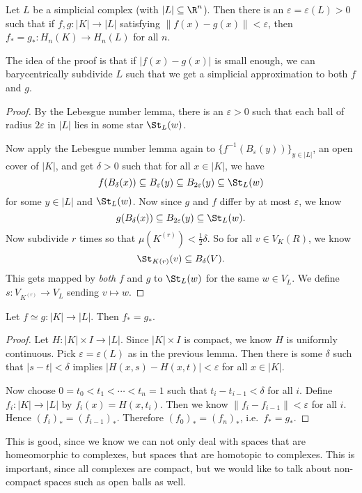\documentclass[a4paper]{article}
\begin{document}
\begin{lemma}
  Let $L$ be a simplicial complex (with $|L| \subseteq \R^n$). Then there is an $\varepsilon = \varepsilon(L) > 0$ such that if $f, g: |K| \to |L|$ satisfying $\|f(x) - g(x)\| < \varepsilon$, then $f_* = g_*: H_n(K) \to H_n(L)$ for all $n$.
\end{lemma}
The idea of the proof is that if $|f(x) - g(x)|$ is small enough, we can barycentrically subdivide $L$ such that we get a simplicial approximation to both $f$ and $g$.
\begin{proof}
  By the Lebesgue number lemma, there is an $\varepsilon > 0$ such that each ball of radius $2\varepsilon$ in $|L|$ lies in some star $\St_L(w)$.

  Now apply the Lebesgue number lemma again to $\{f^{-1}(B_\varepsilon(y))\}_{y \in |L|}$, an open cover of $|K|$, and get $\delta > 0$ such that for all $x \in |K|$, we have
  \[
    f(B_\delta(x)) \subseteq B_\varepsilon(y) \subseteq B_{2\varepsilon}(y) \subseteq \St_L(w)
  \]
  for some $y \in |L|$ and $\St_L(w)$. Now since $g$ and $f$ differ by at most $\varepsilon$, we know
  \[
    g(B_\delta(x)) \subseteq B_{2\varepsilon}(y) \subseteq \St_L(w).
  \]
  Now subdivide $r$ times so that $\mu(K^{(r)}) < \frac{1}{2} \delta$. So for all $v \in V_K(R)$, we know
  \[
    \St_{K(r)} (v) \subseteq B_\delta(V).
  \]
  This gets mapped by \emph{both} $f$ and $g$ to $\St_L(w)$ for the same $w \in V_L$. We define $s: V_{K^{(r)}} \to V_L$ sending $v \mapsto w$.
\end{proof}

\begin{thm}
  Let $f\simeq g: |K| \to |L|$. Then $f_* = g_*$.
\end{thm}

\begin{proof}
  Let $H: |K| \times I \to |L|$. Since $|K|\times I$ is compact, we know $H$ is uniformly continuous. Pick $\varepsilon = \varepsilon(L)$ as in the previous lemma. Then there is some $\delta$ such that $|s - t| < \delta$ implies $|H(x, s) - H(x, t)| < \varepsilon$ for all $x \in |K|$.

  Now choose $0 = t_0 < t_1 < \cdots < t_n = 1$ such that $t_i - t_{i - 1} < \delta$ for all $i$. Define $f_i: |K| \to |L|$ by $f_i(x) = H(x, t_i)$. Then we know $\|f_i - f_{i - 1}\| < \varepsilon$ for all $i$. Hence $(f_i)_* = (f_{i - 1})_*$. Therefore $(f_0)_* = (f_n)_*$, i.e.\ $f_* = g_*$.
\end{proof}

This is good, since we know we can not only deal with spaces that are homeomorphic to complexes, but spaces that are homotopic to complexes. This is important, since all complexes are compact, but we would like to talk about non-compact spaces such as open balls as well.
\end{document}
